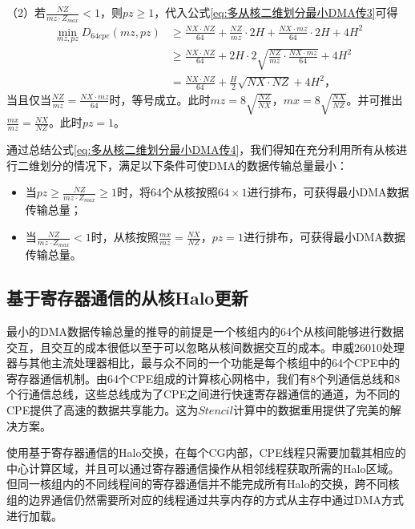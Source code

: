 （2）若$\frac{NZ}{mz\cdot Z_{max}} < 1$，则$pz\ge 1$，代入公式\ref{eq:多从核二维划分最小DMA传3}可得
\begin{equation}
\begin{aligned}
  \min_{mz,pz} D_{64cpe}(mz,pz) &\ge \frac{NX\cdot NZ}{64}+\frac{NZ}{mz}\cdot 2H+\frac{NX\cdot mz}{64} \cdot 2H + 4H^2 \\
  &\ge \frac{NX\cdot NZ}{64}+2H\cdot2\sqrt{\frac{NZ}{mz}\cdot\frac{NX\cdot mz}{64} } + 4H^2 \\
  &=\frac{NX\cdot NZ}{64}+\frac{H}{2}\sqrt{NX\cdot NZ}+ 4H^2
  ，
\end{aligned}
  \label{eq:多从核二维划分最小DMA传5}
\end{equation}
当且仅当$\frac{NZ}{mz}=\frac{NX\cdot mz}{64}$时，等号成立。此时$mz=8\sqrt{\frac{NZ}{NX}}$，$mx=8\sqrt{\frac{NX}{NZ}}$。并可推出$\frac{mx}{mz}=\frac{NX}{NZ}$。此时$pz=1$。

通过总结公式\ref{eq:多从核二维划分最小DMA传4}，我们得知在充分利用所有从核进行二维划分的情况下，满足以下条件可使DMA的数据传输总量最小：
\begin{itemize}
  \item 当$pz \ge \frac{NZ}{mz\cdot Z_{max}} \ge 1$时，将64个从核按照$64\times 1$进行排布，可获得最小DMA数据传输总量；
  \item 当$\frac{NZ}{mz\cdot Z_{max}} < 1$时，从核按照$\frac{mx}{mz}=\frac{NX}{NZ}，pz=1$进行排布，可获得最小DMA数据传输总量。
\end{itemize}

\subsection{基于寄存器通信的从核Halo更新}
\label{sub:寄存器通信}

最小的DMA数据传输总量的推导的前提是一个核组内的64个从核间能够进行数据交互，且交互的成本很低以至于可以忽略从核间数据交互的成本。申威26010处理器与其他主流处理器相比，最与众不同的一个功能是每个核组中的64个CPE中的寄存器通信机制。由64个CPE组成的计算核心网格中，我们有8个列通信总线和8个行通信总线，这些总线成为了CPE之间进行快速寄存器通信的通道，为不同的CPE提供了高速的数据共享能力。这为$Stencil$计算中的数据重用提供了完美的解决方案。

使用基于寄存器通信的Halo交换，在每个CG内部，CPE线程只需要加载其相应的中心计算区域，并且可以通过寄存器通信操作从相邻线程获取所需的Halo区域。但同一核组内的不同线程间的寄存器通信并不能完成所有Halo的交换，跨不同核组的边界通信仍然需要所对应的线程通过共享内存的方式从主存中通过DMA方式进行加载。

